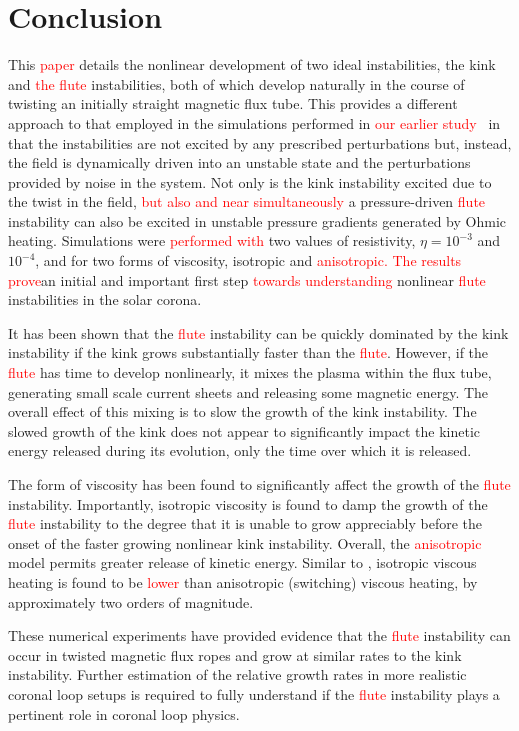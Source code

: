 \documentclass[12pt]{article}
\newcommand{\rs}[2]{\textcolor{red}{#2}}
\begin{document}
\section{Conclusion}
\label{sec-conclusions}

This \rs{chapter}{paper} details the nonlinear development of two
ideal instabilities, the kink and \rs{}{the} \rs{fluting}{flute} instabilities,
both of which develop naturally in the course of twisting an initially
straight magnetic flux tube. This provides a different approach to
that employed in the simulations performed in \rs{chapter}{our earlier
  study}~\cite{quinnEffectAnisotropicViscosity2020} in that the
instabilities are not excited by any prescribed perturbations but,
instead, the field is dynamically driven into an unstable state and
the perturbations provided by noise in the system. Not only is the
kink instability excited due to the twist in the field, \rs{}{but also
and near simultaneously} a pressure-driven \rs{fluting}{flute}
instability can also be excited in unstable pressure gradients
generated by Ohmic heating. Simulations 
were \rs{run}{performed} \rs{over}{with} two values of resistivity,
$\eta=10^{-3}$ and $10^{-4}$, and for two forms of viscosity, isotropic and
\rs{switching}{anisotropic}\rs{, providing}{. The results prove}an
initial and important first step \rs{into the simulation of}{towards
understanding} nonlinear \rs{fluting}{flute} instabilities in the
solar corona.  

It has been shown that the \rs{fluting}{flute} instability can be quickly dominated by the kink instability if the kink grows substantially faster than the \rs{fluting}{flute}. However, if the \rs{fluting}{flute} has time to develop nonlinearly, it mixes the plasma within the flux tube, generating small scale current sheets and releasing some magnetic energy. The overall effect of this mixing is to slow the growth of the kink instability. The slowed growth of the kink does not appear to significantly impact the kinetic energy released during its evolution, only the time over which it is released. 

The form of viscosity has been found to significantly affect the
growth of the \rs{fluting}{flute} instability. Importantly, isotropic
viscosity is found to damp the growth of the \rs{fluting}{flute}
instability to the degree that it is unable to grow appreciably before
the onset of the faster growing nonlinear kink instability. Overall,
the \rs{switching}{anisotropic} model permits greater release of
kinetic energy. Similar to \rs{chapter}{}
\cite{quinnEffectAnisotropicViscosity2020}, isotropic viscous heating
is found to be \rs{significantly lower}{lower} than anisotropic (switching)
viscous heating, by approximately two orders of magnitude. 

These numerical experiments have provided evidence that the \rs{fluting}{flute} instability can occur in twisted magnetic flux ropes and grow at similar rates to the kink instability. Further estimation of the relative growth rates in more realistic coronal loop setups is required to fully understand if the \rs{fluting}{flute} instability plays a pertinent role in coronal loop physics.

\printbibliography
\end{document}
